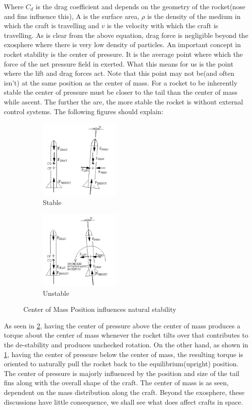 \documentclass[12pt, letterpaper]{article}
\begin{document}
Where $C_d$ is the drag coefficient and depends on the geometry of the rocket(nose and fins influence this), A is the surface area, $\rho$ is the density of the medium in which the craft is travelling and $v$ is the velocity with which the craft is travelling. As is clear from the above equation, drag force is negligible beyond the exosphere where there is very low density of particles. An important concept in rocket stability is the center of pressure. It is the average point where which the force of the net pressure field in exerted. What this means for us is the point where the lift and drag forces act. Note that this point may not be(and often isn't) at the same position as the center of mass. For a rocket to be inherently stable the center of pressure must be closer to the tail than the center of mass while ascent. The further the are, the more stable the rocket is without external control systems. The following figures should explain:

\begin{figure}[h!]
\centering
\begin{subfigure}{.5\textwidth}
  \centering
  \includegraphics[width=150px]{stable}
  \caption{Stable}
  \label{fig:stable}
\end{subfigure}%
\begin{subfigure}{.5\textwidth}
  \centering
  \includegraphics[width=150px]{unstable}
  \caption{Unstable}
  \label{fig:unstable}
\end{subfigure}
\caption{Center of Mass Position influences natural stability}
\label{fig:COP}
\end{figure}

As seen in \ref{fig:unstable}, having the center of pressure above the center of mass produces a torque about the center of mass whenever the rocket tilts over that contributes to the de-stability and produces unchecked rotation. On the other hand, as shown in \ref{fig:stable}, having the center of pressure below the center of mass, the resulting torque is oriented to naturally pull the rocket back to the equilibrium(upright) position. The center of pressure is majorly influenced by the position and size of the tail fins along with the overall shape of the craft. The center of mass is as seen, dependent on the mass distribution along the craft. Beyond the exosphere, these discussions have little consequence, we shall see what does affect crafts in space.
\end{document}
